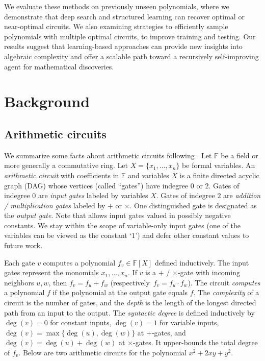 \documentclass{article} %
\begin{document}
We evaluate these methods on previously unseen polynomials, where we demonstrate that deep search and structured learning can recover optimal or near-optimal circuits. We also examining strategies to efficiently sample polynomials with multiple optimal circuits, to improve training and testing. Our results suggest that learning-based approaches can provide new insights into algebraic complexity and offer a scalable path toward a recursively self-improving agent for mathematical discoveries. 

\section{Background}

\subsection{Arithmetic circuits}
\label{subsec:circuits}

We summarize some facts about arithmetic circuits following \citet{Burgisser1997AlgebraicComplexity}. Let $\mathbb F$ be a field or more generally a commutative ring. Let $X=\{x_1,\dots,x_n\}$ be formal variables. An \textit{arithmetic circuit} with coefficients in $\mathbb F$ and variables $X$ is a finite directed acyclic graph (DAG) whose vertices (called ``gates'') have indegree $0$ or $2$. Gates of indegree $0$ are \textit{input gates} labeled by variables $X$. Gates of indegree $2$ are \textit{addition / multiplication gates} labeled by $+$ or $\times$. One distinguished gate is designated as the \textit{output gate}. Note that \citet{Burgisser1997AlgebraicComplexity} allows input gates valued in possibly negative constants. We stay within the scope of variable-only input gates (one of the variables can be viewed as the constant `$1$') and defer other constant values to future work.

Each gate $v$ computes a polynomial $f_v\in \mathbb F[X]$ defined inductively. The input gates represent the monomials $x_1, \dots, x_n$. If $v$ is a $+$ / $\times$-gate with incoming neighbors $u,w$, then $f_v=f_u+f_w$ (respectively\ $f_v=f_u\cdot f_w$). The circuit \textit{computes} a polynomial $f$ if the polynomial at the output gate equals $f$. The \textit{complexity} of a circuit is the number of gates, and the \textit{depth} is the length of the longest directed path from an input to the output. The \textit{syntactic degree} is defined inductively by $\deg(v)=0$ for constant inputs, $\deg(v)=1$ for variable inputs, $\deg(v)=\max\{\deg(u),\deg(w)\}$ at $+$-gates, and $\deg(v)=\deg(u)+\deg(w)$ at $\times$-gates. It upper-bounds the total degree of $f_v$. Below are two arithmetic circuits for the polynomial $x^2 + 2xy + y^2$. 
\end{document}
